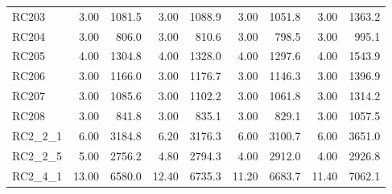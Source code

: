 \documentclass{article}
\begin{document}
{\begin{longtable}{l r r r r r r r r }
RC203 & 3.00 & 1081.5 & 3.00 & 1088.9 & 3.00 & 1051.8 & 3.00 & 1363.2 \\
RC204 & 3.00 & 806.0 & 3.00 & 810.6 & 3.00 & 798.5 & 3.00 & 995.1 \\
RC205 & 4.00 & 1304.8 & 4.00 & 1328.0 & 4.00 & 1297.6 & 4.00 & 1543.9 \\
RC206 & 3.00 & 1166.0 & 3.00 & 1176.7 & 3.00 & 1146.3 & 3.00 & 1396.9 \\
RC207 & 3.00 & 1085.6 & 3.00 & 1102.2 & 3.00 & 1061.8 & 3.00 & 1314.2 \\
RC208 & 3.00 & 841.8 & 3.00 & 835.1 & 3.00 & 829.1 & 3.00 & 1057.5 \\
RC2\_2\_1 & 6.00 & 3184.8 & 6.20 & 3176.3 & 6.00 & 3100.7 & 6.00 & 3651.0 \\
RC2\_2\_5 & 5.00 & 2756.2 & 4.80 & 2794.3 & 4.00 & 2912.0 & 4.00 & 2926.8 \\
RC2\_4\_1 & 13.00 & 6580.0 & 12.40 & 6735.3 & 11.20 & 6683.7 & 11.40 & 7062.1 \\
\bottomrule
\end{longtable}

}
\end{document}
